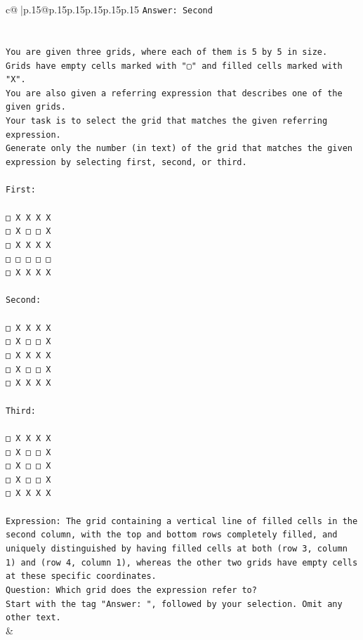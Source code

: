 \documentclass{article}
\begin{document}
{\begin{supertabular}{c@{$\;$}|p{.15\linewidth}@{}p{.15\linewidth}p{.15\linewidth}p{.15\linewidth}p{.15\linewidth}p{.15\linewidth}}
{{{\texttt{Answer: Second} \\
\\ 
\\ 
\texttt{You are given three grids, where each of them is 5 by 5 in size.} \\
\texttt{Grids have empty cells marked with "▢" and filled cells marked with "X".} \\
\texttt{You are also given a referring expression that describes one of the given grids.} \\
\texttt{Your task is to select the grid that matches the given referring expression.} \\
\texttt{Generate only the number (in text) of the grid that matches the given expression by selecting first, second, or third.} \\
\\ 
\texttt{First:} \\
\\ 
\texttt{□ X X X X} \\
\texttt{□ X □ □ X} \\
\texttt{□ X X X X} \\
\texttt{□ □ □ □ □} \\
\texttt{□ X X X X} \\
\\ 
\texttt{Second:} \\
\\ 
\texttt{□ X X X X} \\
\texttt{□ X □ □ X} \\
\texttt{□ X X X X} \\
\texttt{□ X □ □ X} \\
\texttt{□ X X X X} \\
\\ 
\texttt{Third:} \\
\\ 
\texttt{□ X X X X} \\
\texttt{□ X □ □ X} \\
\texttt{□ X □ □ X} \\
\texttt{□ X □ □ X} \\
\texttt{□ X X X X} \\
\\ 
\texttt{Expression: The grid containing a vertical line of filled cells in the second column, with the top and bottom rows completely filled, and uniquely distinguished by having filled cells at both (row 3, column 1) and (row 4, column 1), whereas the other two grids have empty cells at these specific coordinates.} \\
\texttt{Question: Which grid does the expression refer to?} \\
\texttt{Start with the tag "Answer: ", followed by your selection. Omit any other text.} \\
            }
        }
    }
    & \\ \\


\end{supertabular}}
\end{document}
